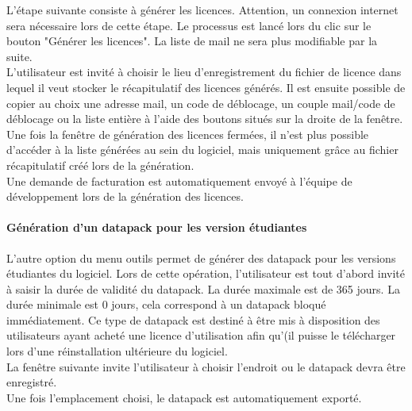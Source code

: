 L'étape suivante consiste à générer les licences. Attention, un connexion internet sera nécessaire lors de cette étape. Le processus est lancé lors du clic sur le bouton "Générer les licences". La liste de mail ne sera plus modifiable par la suite.\\

L'utilisateur est invité à choisir le lieu d'enregistrement du fichier de licence dans lequel il veut stocker le récapitulatif des licences générés. Il est ensuite possible de copier au choix une adresse mail, un code de déblocage, un couple mail/code de déblocage ou la liste entière à l'aide des boutons situés sur la droite de la fenêtre.\\

Une fois la fenêtre de génération des licences fermées, il n'est plus possible d'accéder à la liste générées au sein du logiciel, mais uniquement grâce au fichier récapitulatif créé lors de la génération.\\

Une demande de facturation est automatiquement envoyé à l'équipe de développement lors de la génération des licences.

\paragraph{Génération d'un datapack pour les version étudiantes}

L'autre option du menu outils permet de générer des datapack pour les versions étudiantes du logiciel. Lors de cette opération, l'utilisateur est tout d'abord invité à saisir la durée de validité du datapack. La durée maximale est de 365 jours. La durée minimale est 0 jours, cela correspond à un datapack bloqué immédiatement. Ce type de datapack est destiné à être mis à disposition des utilisateurs ayant acheté une licence d'utilisation afin qu'(il puisse le télécharger lors d'une réinstallation ultérieure du logiciel.\\

La fenêtre suivante invite l'utilisateur à choisir l'endroit ou le datapack devra être enregistré.\\

Une fois l'emplacement choisi, le datapack est automatiquement exporté.\\




